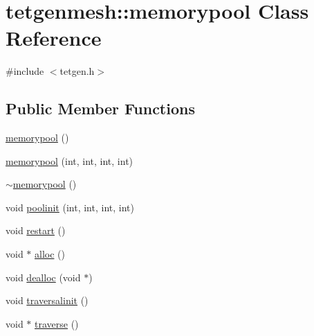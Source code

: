 \hypertarget{classtetgenmesh_1_1memorypool}{}\section{tetgenmesh\+:\+:memorypool Class Reference}
\label{classtetgenmesh_1_1memorypool}


{\ttfamily \#include $<$tetgen.\+h$>$}

\subsection*{Public Member Functions}
\begin{DoxyCompactItemize}
\item 
\hyperlink{classtetgenmesh_1_1memorypool_a101ca0a62a9baaa0a636d1ee207a3068}{memorypool} ()
\item 
\hyperlink{classtetgenmesh_1_1memorypool_a11c634d40b58e7a23cffb0ca1e9fcbec}{memorypool} (int, int, int, int)
\item 
\hyperlink{classtetgenmesh_1_1memorypool_a66f5279cdde550dc9359115765d40dce}{$\sim$memorypool} ()
\item 
void \hyperlink{classtetgenmesh_1_1memorypool_af1e55812acd2838a7566ea97f7af85c1}{poolinit} (int, int, int, int)
\item 
void \hyperlink{classtetgenmesh_1_1memorypool_a8a34eeaa526e3a27ac9187ff1ead2938}{restart} ()
\item 
void $\ast$ \hyperlink{classtetgenmesh_1_1memorypool_a78b8fcc6ab49719d2217dea62f1ba652}{alloc} ()
\item 
void \hyperlink{classtetgenmesh_1_1memorypool_a0329d16675985efd7fd1e0a0630cabf7}{dealloc} (void $\ast$)
\item 
void \hyperlink{classtetgenmesh_1_1memorypool_a623b101e4e2f249d8b7e5dba65c3f7e2}{traversalinit} ()
\item 
void $\ast$ \hyperlink{classtetgenmesh_1_1memorypool_a118a5e098410329d76aabd99eca0d322}{traverse} ()
\end{DoxyCompactItemize}
